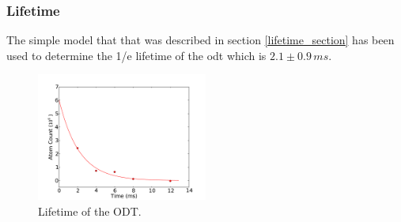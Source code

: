 \subsubsection{Lifetime}
The simple model that that was described in section \ref{lifetime_section} has been used to determine the 1/e lifetime of the \gls{odt} which is $2.1\pm0.9\,\unit{ms}$.

\begin{figure}[h]
\centering
\includegraphics[width=0.5\textwidth]{figs/lifetime.pdf}
\caption{Lifetime of the ODT.}
\label{fig:lifetime}
\end{figure}
